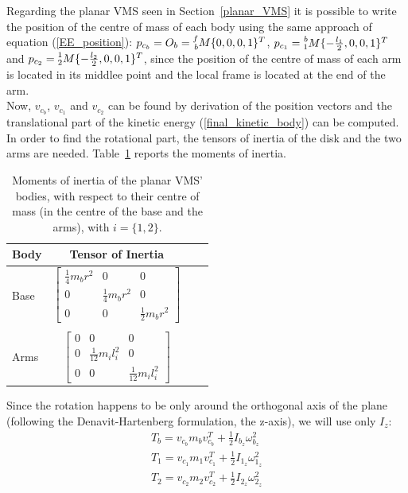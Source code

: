 \documentclass[a4paper,12pt,oneside]{report}
\begin{document}
Regarding the planar VMS seen in Section~\ref{planar_VMS} it is possible to write the position of the centre of mass of each body using the same approach of equation (\ref{EE_position}): $p_{c_b}=O_b=\prescript{f}{b}{M}\{0,0,0,1\}^T$, $p_{c_1}=\prescript{b}{1}{M}\{-\frac{l_1}{2},0,0,1\}^T$ and $p_{c_2}=\prescript{1}{2}{M}\{-\frac{l_2}{2},0,0,1\}^T$, since the position of the centre of mass of each arm is located in its middlee point and the local frame is located at the end of the arm.\\
Now, $v_{c_b}$, $v_{c_1}$ and $v_{c_2}$ can be found by derivation of the position vectors and the translational part of the kinetic energy (\ref{final_kinetic_body}) can be computed.\\
In order to find the rotational part, the tensors of inertia of the disk and the two arms are needed. Table~\ref{inertia_moments} reports the moments of inertia.\\
\begin{table}
  \caption{Moments of inertia of the planar VMS' bodies, with respect to their centre of mass (in the centre of the base and the arms), with $i=\{1,2\}$.}
  \label{inertia_moments}
  \begin{center}
  \begin{tabular}{lccc}
    \toprule
  \textbf{Body} & \textbf{Tensor of Inertia}\\
  \midrule
  Base&$\begin{bmatrix}
    \frac{1}{4}m_br^2&0&0\\
    0&\frac{1}{4}m_br^2&0\\
    0&0&\frac{1}{2}m_br^2
  \end{bmatrix}$\\
  \\
  Arms&$\begin{bmatrix}
    0&0&0\\
    0&\frac{1}{12}m_il_i^2&0\\
    0&0&\frac{1}{12}m_il_i^2
  \end{bmatrix}$\\
  \bottomrule
  \end{tabular}
  \end{center}
  \end{table}
Since the rotation happens to be only around the orthogonal axis of the plane (following the Denavit-Hartenberg formulation, the z-axis), we will use only $I_z$:
\begin{equation}
  \begin{array}{l}
  T_b=v_{c_b}m_bv_{c_b}^T+\frac{1}{2}I_{b_z}\omega_{b_z}^2\\
  T_1=v_{c_1}m_1v_{c_1}^T+\frac{1}{2}I_{1_z}\omega_{1_z}^2\\
  T_2=v_{c_2}m_2v_{c_2}^T+\frac{1}{2}I_{2_z}\omega_{2_z}^2
  \end{array}
  \label{kin_energy}
\end{equation}
\end{document}
